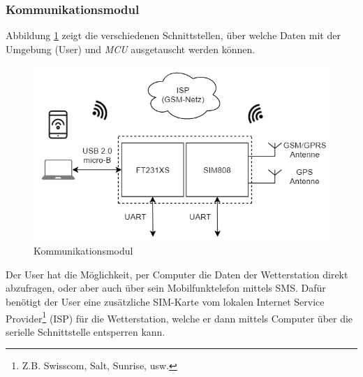 \subsubsection{Kommunikationsmodul}
Abbildung \ref{fig:kommunikationsmodul} zeigt die verschiedenen Schnittstellen, über welche Daten mit der Umgebung (User) und \textit{MCU} ausgetauscht werden können.\\

\begin{figure}[h]
	\centering
	\includegraphics[scale=0.7]{graphics/Konzeptdiagramme/Kommunikationsmodul.PNG}
	\caption{Kommunikationsmodul}
	\label{fig:kommunikationsmodul}
\end{figure}

Der User hat die Möglichkeit, per Computer die Daten der Wetterstation direkt abzufragen, oder aber auch über sein Mobilfunktelefon mittels SMS. Dafür benötigt der User eine zusätzliche SIM-Karte vom lokalen Internet Service Provider\footnote{Z.B. Swisscom, Salt, Sunrise, usw.} (ISP) für die Wetterstation, welche er dann mittels Computer über die serielle Schnittstelle entsperren kann.\\
